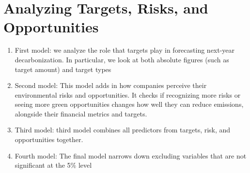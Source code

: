 \section{Analyzing Targets, Risks, and Opportunities}

\begin{enumerate}
    \item First model: we analyze the role that targets play in forecasting next-year decarbonization. In particular, we look at both absolute figures (such as target amount) and target types

    \item Second model: This model adds in how companies perceive their environmental risks and opportunities. It checks if recognizing more risks or seeing more green opportunities changes how well they can reduce emissions, alongside their financial metrics and targets.
    \item Third model: third model combines all predictors from targets, risk, and opportunities together.
    \item Fourth model: The final model narrows down excluding variables that are not significant at the 5\% level
\end{enumerate}




